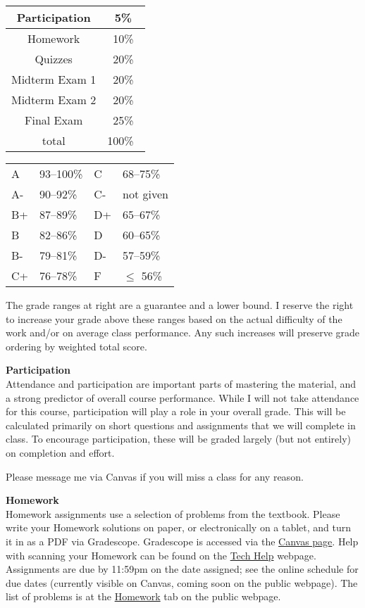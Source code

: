 \documentclass[12pt]{article}
\renewcommand{\emph}[1]{\textsf{\textbf{#1}}}
\newcommand{\localhead}[1]{\par\smallskip\textbf{#1} \smallskip\nobreak\\}%
\def\heading#1{\localhead{\large\emph{#1}}}
\begin{document}
\begin{multicols}{2}
\begin{tabular}{|c|c|}
\hline
Participation & 5\%\\
\hline
Homework & 10\% \\
\hline
Quizzes & 20\% \\
\hline
Midterm Exam 1 & 20\% \\
\hline
Midterm Exam 2 & 20\%  \\
\hline
Final Exam & 25\% \\
\hline
total & 100\% \, \\
\hline
\end{tabular}


\begin{tabular}{llll}
A  & 93--100\%& C  & 68--75\%  \\
A- & 90--92\% & C- & not given \\
B+ & 87--89\% & D+ & 65--67\%  \\
B  & 82--86\% & D  & 60--65\%  \\
B- & 79--81\% & D- & 57--59\%  \\
C+ & 76--78\% & F  & $\le$ 56\%
\end{tabular}
\end{multicols}

The grade ranges at right are a guarantee and a lower bound. I reserve the right to increase your grade above these ranges based on the actual difficulty of the work and/or on average class performance.  Any such increases will preserve grade ordering by weighted total score. 


\heading{Participation}
Attendance and participation are important parts of mastering the
material, and a strong predictor of overall course performance.
While I will not take attendance for this course, participation will
play a role in your overall grade. This will be calculated primarily
on short questions and assignments that we will complete in class. To
encourage participation, these will be graded largely (but not
entirely) on completion
and effort.

Please message me via Canvas if you will miss a class for any reason.

\newpage

\heading{Homework}
Homework assignments use a selection of problems from the textbook.
Please write your Homework solutions on paper, or electronically on a
tablet, and turn it in as a PDF via Gradescope.  Gradescope is
accessed via the \href{https://canvas.alaska.edu/courses/21592}{Canvas
page}.  Help with scanning your Homework can be found on the
\href{https://uaf-math251.github.io/calc2/techHelp.html}{Tech Help}
webpage.  Assignments are due by 11:59pm on the date assigned; see the
online 
schedule
for due dates (currently visible on Canvas, coming soon on the public webpage).  The list of problems is at the
\href{https://uaf-math251.github.io/calc2/homework.html}{Homework} tab
on the public webpage.
\end{document}
